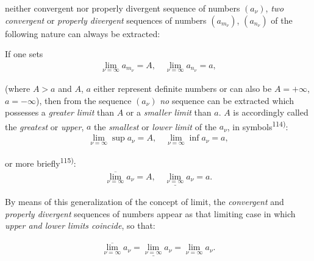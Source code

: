 \thispagestyle{fancy}

\vspace{0.5cm}

neither convergent nor properly divergent sequence of numbers $(a_\nu)$, \textit{two convergent} or \textit{properly divergent} sequences of numbers $(a_{m_\nu})$, $(a_{n_\nu})$ of the following nature can always be extracted:

If one sets
\vspace{-0.5cm}
\begin{align}
    \lim_{\nu=\infty} a_{m_\nu} = A, \quad \lim_{\nu=\infty} a_{n_\nu} = a,
\end{align}
\vspace{-0.5cm}

(where $A > a$ and $A$, $a$ either represent definite numbers or can also be $A = +\infty$, $a = -\infty$), then from the sequence $(a_\nu)$ \textit{no} sequence can be extracted which possesses a \textit{greater limit} than $A$ or a \textit{smaller limit} than $a$. $A$ is accordingly called the \textit{greatest} or \textit{upper}, $a$ the \textit{smallest} or \textit{lower limit} of the $a_\nu$, in symbols\textsuperscript{114)}:
\vspace{-0.5cm}
\begin{align}
    \lim_{\nu=\infty} \sup a_\nu = A, \quad \lim_{\nu=\infty} \inf a_\nu = a,
\end{align}
\vspace{-0.5cm}

or more briefly\textsuperscript{115)}:
\vspace{-0.5cm}
\begin{align}
    \overline{\lim_{\nu=\infty}} a_\nu = A, \quad \underline{\lim_{\nu=\infty}} a_\nu = a.
\end{align}
\vspace{-0.5cm}

By means of this generalization of the concept of limit, the \textit{convergent} and \textit{properly divergent} sequences of numbers appear as that limiting case in which \textit{upper and lower limits coincide}, so that:

\vspace{-0.5cm}
\begin{align}
    \overline{\lim_{\nu=\infty}} a_\nu = \underline{\lim_{\nu=\infty}} a_\nu = \lim_{\nu=\infty} a_\nu.
\end{align}
\vspace{-0.5cm}

